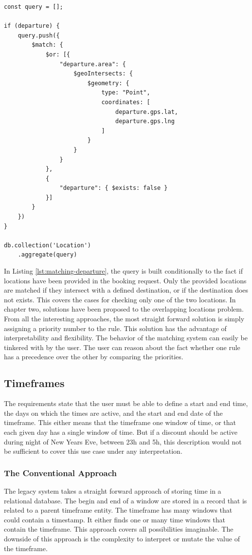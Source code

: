 \begin{center}
\noindent\begin{minipage}{.45\textwidth}
\begin{lstlisting}[caption={Matching departure.}, label={lst:matching-departure}]
const query = [];

if (departure) {
	query.push({
		$match: {
			$or: [{
				"departure.area": {
					$geoIntersects: {
						$geometry: {
							type: "Point",
							coordinates: [
								departure.gps.lat,
								departure.gps.lng
							]
						}
					}
				}
			},
			{
				"departure": { $exists: false }
			}]
		}
	})
}

db.collection('Location')
	.aggregate(query)
\end{lstlisting}
\end{minipage}
\end{center}

In Listing \ref{lst:matching-departure}, the query is built conditionally to the fact if locations have been provided in the booking request. Only the provided locations are matched if they intersect with a defined destination, or if the destination does not exists. This covers the cases for checking only one of the two locations. In chapter two, solutions have been proposed to the overlapping locations problem. From all the interesting approaches, the most straight forward solution is simply assigning a priority number to the rule. This solution has the advantage of interpretability and flexibility. The behavior of the matching system can easily be tinkered with by the user. The user can reason about the fact whether one rule has a precedence over the other by comparing the priorities.

\subsection{Timeframes}
The requirements state that the user must be able to define a start and end time, the days on which the times are active, and the start and end date of the timeframe. This either means that the timeframe one window of time, or that each given day has a single window of time. But if a discount should be active during night of New Years Eve, between 23h and 5h, this description would not be sufficient to cover this use case under any interpretation.

\subsubsection{The Conventional Approach}
The legacy system takes a straight forward approach of storing time in a relational database. The begin and end of a window are stored in a record that is related to a parent timeframe entity. The timeframe has many windows that could contain a timestamp. It either finds one or many time windows that contain the timeframe. This approach covers all possibilities imaginable. The downside of this approach is the complexity to interpret or mutate the value of the timeframe.

